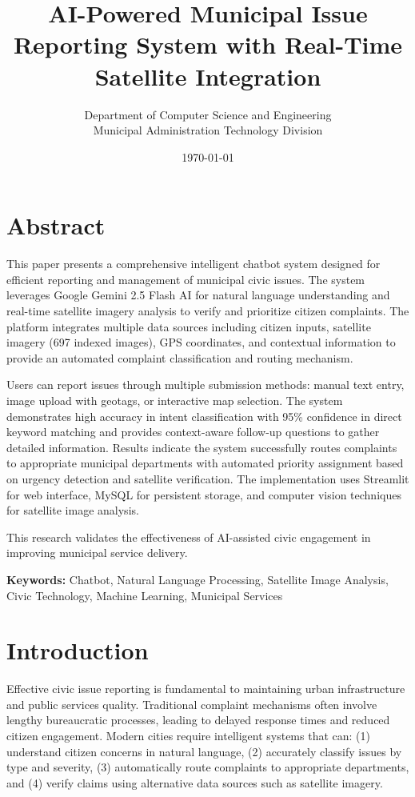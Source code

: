 \documentclass[11pt,a4paper]{article}
\title{\textbf{AI-Powered Municipal Issue Reporting System with Real-Time Satellite Integration}}
\author{Department of Computer Science and Engineering\\
Municipal Administration Technology Division}
\date{\today}
\begin{document}
\maketitle

\section*{Abstract}

This paper presents a comprehensive intelligent chatbot system designed for efficient reporting and management of municipal civic issues. The system leverages Google Gemini 2.5 Flash AI for natural language understanding and real-time satellite imagery analysis to verify and prioritize citizen complaints. The platform integrates multiple data sources including citizen inputs, satellite imagery (697 indexed images), GPS coordinates, and contextual information to provide an automated complaint classification and routing mechanism. 

Users can report issues through multiple submission methods: manual text entry, image upload with geotags, or interactive map selection. The system demonstrates high accuracy in intent classification with 95\% confidence in direct keyword matching and provides context-aware follow-up questions to gather detailed information. Results indicate the system successfully routes complaints to appropriate municipal departments with automated priority assignment based on urgency detection and satellite verification. The implementation uses Streamlit for web interface, MySQL for persistent storage, and computer vision techniques for satellite image analysis.

This research validates the effectiveness of AI-assisted civic engagement in improving municipal service delivery.

\vspace{0.5cm}
\noindent \textbf{Keywords:} Chatbot, Natural Language Processing, Satellite Image Analysis, Civic Technology, Machine Learning, Municipal Services

\newpage

\section{Introduction}

Effective civic issue reporting is fundamental to maintaining urban infrastructure and public services quality. Traditional complaint mechanisms often involve lengthy bureaucratic processes, leading to delayed response times and reduced citizen engagement. Modern cities require intelligent systems that can: (1) understand citizen concerns in natural language, (2) accurately classify issues by type and severity, (3) automatically route complaints to appropriate departments, and (4) verify claims using alternative data sources such as satellite imagery.
\end{document}
